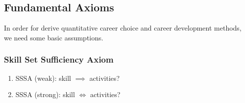 \documentclass{elsarticle} %
\begin{document}
\subsection{Fundamental Axioms}
In order for derive quantitative career choice and career development methods,
we need some basic assumptions.

\subsubsection{Skill Set Sufficiency Axiom}
\begin{enumerate}
    \item SSSA (weak): skill $\implies$ activities?
    \item SSSA (strong): skill $\iff$ activities?
\end{enumerate}
\end{document}
